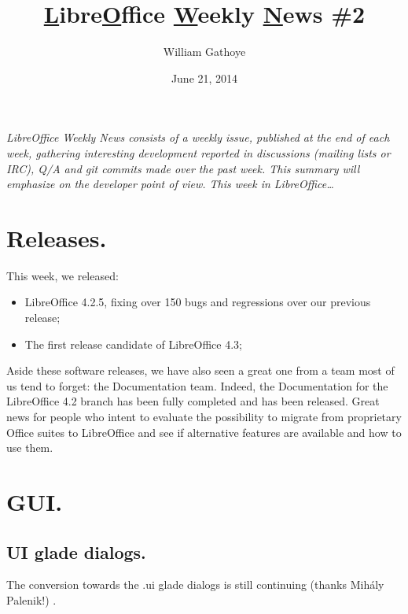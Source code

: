 \documentclass{article}
\begin{document}
\title{\underline{L}ibre\underline{O}ffice \underline{W}eekly \underline{N}ews \#2}
\author{William Gathoye}
\date{June 21, 2014}
\maketitle


\emph{LibreOffice Weekly News consists of a weekly issue, published at the end of
each week, gathering interesting development reported in discussions (mailing
lists or IRC), Q/A and git commits made over the past week. This summary will
emphasize on the developer point of view.
This week in LibreOffice\ldots}

\tableofcontents



\section{Releases.}

This week, we released:

\begin{itemize}
    \item LibreOffice 4.2.5, fixing over 150 bugs and regressions over our previous release\cite{libo425};
    \item The first release candidate of LibreOffice 4.3\cite{libo43rc1};
\end{itemize}

Aside these software releases, we have also seen a great one from a team most of us tend to forget: the Documentation team. Indeed, the Documentation for the LibreOffice 4.2 branch has been fully completed and has been released\cite{doc42}. Great news for people who intent to evaluate the possibility to migrate from proprietary Office suites to LibreOffice and see if alternative features are available and how to use them.



\section{GUI.}

\subsection{UI glade dialogs.}

The conversion towards the .ui glade dialogs is still continuing (thanks Mihály Palenik!) \cite{gladeUi1,gladeUi2,gladeUi3,gladeUi4}.
\end{document}
